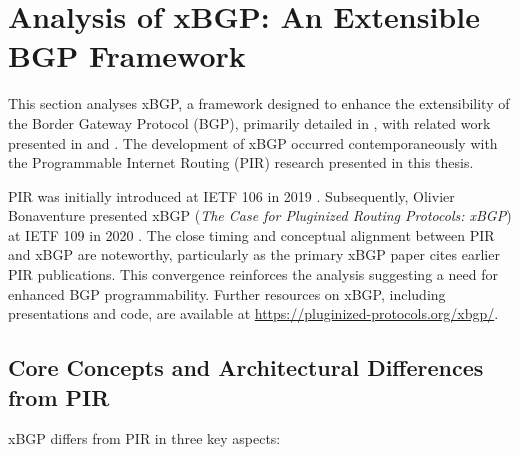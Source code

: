 


\section{Analysis of xBGP: An Extensible BGP Framework}

This section analyses xBGP, a framework designed to enhance the extensibility of the Border Gateway Protocol (BGP), primarily detailed in \cite{Wirtgen2020}, with related work presented in \cite{wirtgen2019} and \cite{wirtgen2023}. The development of xBGP occurred contemporaneously with the Programmable Internet Routing (PIR) research presented in this thesis.

PIR was initially introduced at IETF 106 in 2019 \cite{hart2019}. Subsequently, Olivier Bonaventure presented xBGP (\textit{The Case for Pluginized Routing Protocols: xBGP}) at IETF 109 in 2020 \cite{ietf109xbgb}. The close timing and conceptual alignment between PIR and xBGP are noteworthy, particularly as the primary xBGP paper \cite{Wirtgen2020} cites earlier PIR publications. This convergence reinforces the analysis suggesting a need for enhanced BGP programmability. Further resources on xBGP, including presentations and code, are available at \url{https://pluginized-protocols.org/xbgp/}.

\subsection{Core Concepts and Architectural Differences from PIR}

xBGP differs from PIR in three key aspects:

